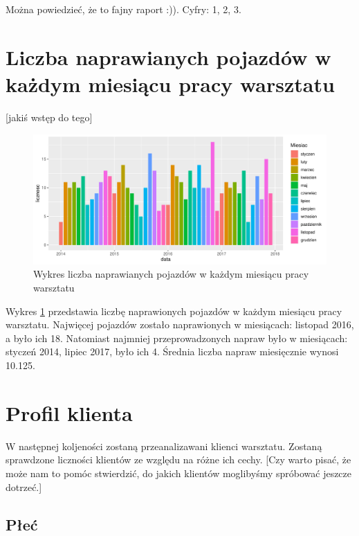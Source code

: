 \documentclass{article}\usepackage[]{graphicx}\usepackage[]{xcolor}
\makeatletter
\def\maxwidth{ %
  \ifdim\Gin@nat@width>\linewidth
    \linewidth
  \else
    \Gin@nat@width
  \fi
}
\newenvironment{knitrout}{}{} %
\makeatother
\begin{document}
Można powiedzieć, że to fajny raport :)).
Cyfry: 1, 2, 3.

\section{Liczba naprawianych pojazdów w każdym miesiącu pracy warsztatu}

{\color{red}[jakiś wstęp do tego]}

\begin{knitrout}
\color{fgcolor}\begin{figure}[h]
\includegraphics[width=\maxwidth]{figure/fig_naprawy_miesiecznie-1} \caption[Wykres liczba naprawianych pojazdów w każdym miesiącu pracy warsztatu]{Wykres liczba naprawianych pojazdów w każdym miesiącu pracy warsztatu}\label{fig:fig_naprawy_miesiecznie}
\end{figure}

\end{knitrout}

Wykres \ref{fig:fig_naprawy_miesiecznie} przedstawia liczbę naprawionych pojazdów w każdym miesiącu pracy warsztatu. Najwięcej pojazdów zostało naprawionych w miesiącach: 
listopad 2016,
a było ich 18. Natomiast najmniej przeprowadzonych napraw było w miesiącach:
styczeń 2014, lipiec 2017,
było ich 4. Średnia liczba napraw miesięcznie wynosi 
10.125. 

\section{Profil klienta}

W następnej koljeności zostaną przeanalizawani klienci warsztatu. Zostaną sprawdzone liczności klientów ze względu na różne ich cechy. {\color{red}[Czy warto pisać, że może nam to pomóc stwierdzić, do jakich klientów moglibyśmy spróbować jeszcze dotrzeć.]}

\subsection{Płeć}
\end{document}
